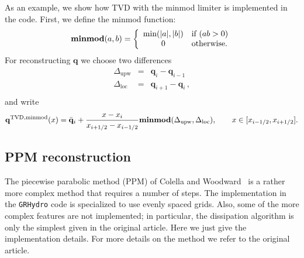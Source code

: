 \documentclass{article}
\begin{document}
As an example, we show how TVD with the minmod limiter is implemented
in the code. First, we define the minmod function:
\begin{equation}
  \label{eq:tvdminmod}
  \mathrm{\mathbf{minmod}}(a,b) = \left\{ \begin{array}{c l} 
      \text{min}(|a|,|b|) & \text{if } (a b > 0)\\
      0 & \text{otherwise}. \end{array}\right.
\end{equation}
For reconstructing $\mathbf{q}$ %
we choose two differences
\begin{equation}
  \begin{array}{lcl}
    \Delta_{\mathrm{upw}} & = & {\mathbf{q}}_{i} - {\mathbf{q}}_{i-1}\\
    \Delta_{\mathrm{loc}} & = & {\mathbf{q}}_{i+1} - {\mathbf{q}}_{i}\,,\\
  \end{array}
\end{equation}
and write
\begin{equation}
  {\bf q}^{{\rm TVD,minmod}}(x) = \bar{{\bf q}}_i + \frac{x -
  x_i}{x_{i+1/2} - x_{i-1/2}} \mathbf{minmod}(\Delta_{\mathrm{upw}},\Delta_{\mathrm{loc}}), 
    \qquad x \in [
  x_{i-1/2}, x_{i+1/2} ]. 
\end{equation}
\subsection{PPM reconstruction}
\label{sec:ppm}

The piecewise parabolic method (PPM) of Colella and
Woodward~\cite{ppm} is a rather more complex method that requires a
number of steps. The implementation in the {\tt GRHydro} code is specialized
to use evenly spaced grids. Also, some of the more complex features are not
implemented; in particular, the dissipation algorithm is only the
simplest given in the original article. Here we just give the implementation
details. For more details on the method we refer to the original
article.
\end{document}
